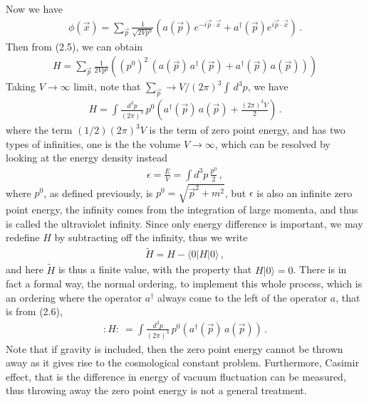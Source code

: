 \documentclass[11pt, onesided]{book}
\theoremstyle{break}
\theoremstyle{break}
\newcommand{\that}[1]{\widetilde{#1}}
\begin{document}
Now we have
\begin{align*}
\phi(\vec{x}) = \sum_{\vec{p}} \frac{1}{\sqrt{2V p^0}}\left( a(\vec{p}) \, e^{-i\vec{p}\cdot\vec{x}} + a^\dagger(\vec{p})e^{i\vec{p}\cdot\vec{x}}\right)\,.
\end{align*}
Then from (2.5), we can obtain
\begin{align}
H = \sum_{\vec{p}} \frac{1}{2Vp^0} \left( (p^0)^2\, (a(\vec{p})\, a^\dagger(\vec{p}) + a^\dagger(\vec{p})\, a(\vec{p}) ) \right)
\end{align}
Taking $V \to \infty$ limit, note that $\sum_{\vec{p}} \to V/(2\pi)^3 \int\, d^3p$, we have
\begin{align*}
H = \int \frac{d^3p}{(2\pi)^3}\, p^0\left( a^\dagger(\vec{p})\, a(\vec{p}) + \frac{(2\pi)^3 V}{2}\right)\,.
\end{align*}
where the term $(1/2)(2\pi)^3 V$ is the term of zero point energy, and has two types of infinities, one is the the volume $V \to \infty$, which can be resolved by looking at the energy density instead
\begin{align*}
\epsilon = \frac{E}{V} = \int d^3p\, \frac{p^0}{2}\,,
\end{align*}
where $p^0$, as defined previously, is $p^0 = \sqrt{\vec{p}^2 + m^2}$, but $\epsilon$ is also an infinite zero point energy, the infinity comes from the integration of large momenta, and thus is called the ultraviolet infinity. Since only energy difference is important, we may redefine $H$ by subtracting off the infinity, thus we write
\begin{align*}
\that{H} = H - \langle 0 |H|0\rangle\,,
\end{align*}
and here $\that{H}$ is thus a finite value, with the property that $H|0\rangle = 0$. There is in fact a formal way, the normal ordering, to implement this whole process, which is an ordering where the operator $a^\dagger$ always come to the left of the operator $a$, that is from 
(2.6),
\begin{align*}
:H:\ = \int \frac{d^3p}{(2\pi)^3}\, p^0 \left( a^\dagger(\vec{p})\, a(\vec{p}) \right)\,.
\end{align*}
Note that if gravity is included, then the zero point energy cannot be thrown away as it gives rise to the cosmological constant problem. Furthermore, Casimir effect, that is the difference in energy of vacuum fluctuation can be measured, thus throwing away the zero point energy is not a general treatment. \\
\end{document}
